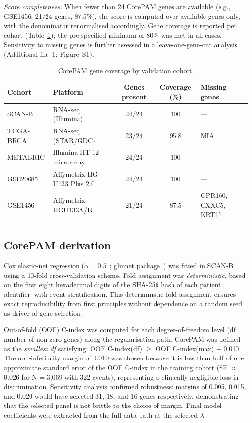 \documentclass[pdflatex,sn-vancouver-num]{sn-jnl}
\begin{document}
\textit{Score completeness:} When fewer than 24 CorePAM genes are available (e.g., GSE1456: 21/24 genes, 87.5\%), the score is computed over available genes only, with the denominator renormalised accordingly. Gene coverage is reported per cohort (Table~\ref{tab:coverage}); the pre-specified minimum of 80\% was met in all cases. Sensitivity to missing genes is further assessed in a leave-one-gene-out analysis (Additional file~1: Figure~S1).

\begin{table}[!ht]
\caption{CorePAM gene coverage by validation cohort.}\label{tab:coverage}
\begin{tabular}{@{}llccl@{}}
\toprule
Cohort & Platform & Genes present & Coverage (\%) & Missing genes \\
\midrule
SCAN-B & RNA-seq (Illumina) & 24/24 & 100 & --- \\
TCGA-BRCA & RNA-seq (STAR/GDC) & 23/24 & 95.8 & MIA \\
METABRIC & Illumina HT-12 microarray & 24/24 & 100 & --- \\
GSE20685 & Affymetrix HG-U133 Plus 2.0 & 24/24 & 100 & --- \\
GSE1456 & Affymetrix HGU133A/B & 21/24 & 87.5 & GPR160, CXXC5, KRT17 \\
\botrule
\end{tabular}
\end{table}

\subsection{CorePAM derivation}\label{subsec:corepam-derivation}

Cox elastic-net regression ($\alpha = 0.5$~\cite{zou2005,tibshirani1997}; glmnet package~\cite{friedman2010,simon2011}) was fitted in SCAN-B using a 10-fold cross-validation scheme. Fold assignment was \textit{deterministic}, based on the first eight hexadecimal digits of the SHA-256 hash of each patient identifier, with event-stratification. This deterministic fold assignment ensures exact reproducibility from first principles without dependence on a random seed as driver of gene selection.

Out-of-fold (OOF) C-index was computed for each degree-of-freedom level (df = number of non-zero genes) along the regularisation path. CorePAM was defined as the \textit{smallest df} satisfying: OOF C-index(df) $\geq$ OOF C-index(max) $-$ 0.010. The non-inferiority margin of 0.010 was chosen because it is less than half of one approximate standard error of the OOF C-index in the training cohort (SE $\approx$ 0.026 for N = 3,069 with 322 events), representing a clinically negligible loss in discrimination. Sensitivity analysis confirmed robustness: margins of 0.005, 0.015, and 0.020 would have selected 31, 18, and 16 genes respectively, demonstrating that the selected panel is not brittle to the choice of margin. Final model coefficients were extracted from the full-data path at the selected $\lambda$.
\end{document}
